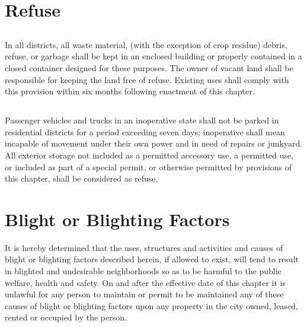 \section{Refuse}
\subsection{}
In all districts, all waste material, (with the exception of crop residue) debris, refuse, or garbage shall be kept in an enclosed building or properly contained in a closed container designed for these purposes. The owner of vacant land shall be responsible for keeping the land free of refuse.  Existing uses shall comply with this provision within six months following enactment of this chapter.
\subsection{}
Passenger vehicles and trucks in an inoperative state shall not be parked in residential districts for a period exceeding seven days; inoperative shall mean incapable of movement under their own power and in need of repairs or junkyard. All exterior storage not included as a permitted accessory use, a permitted use, or included as part of a special permit, or otherwise permitted by provisions of this chapter, shall be considered as refuse.

\section{Blight or Blighting Factors}
It is hereby determined that the uses, structures and activities and causes of blight or blighting factors described herein, if allowed to exist, will tend to result in blighted and undesirable neighborhoods so as to be harmful to the public welfare, health and safety. On and after the effective date of this chapter it is unlawful for any person to maintain or permit to be maintained any of these causes of blight or blighting factors upon any property in the city owned, leased, rented or occupied by the person.

